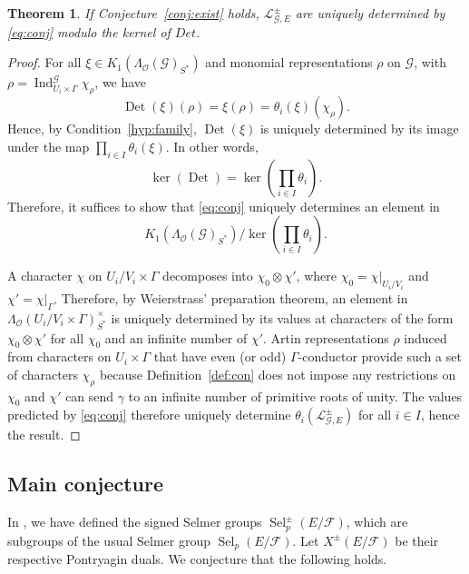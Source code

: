 \documentclass{amsart}
\newtheorem{theorem}{Theorem}[section]
\begin{document}
\begin{theorem}
If Conjecture~\ref{conj:exist} holds, ${\mathcal{L}}_{{\mathcal{G}},E}^\pm$ are uniquely determined by \eqref{eq:conj} modulo the kernel of $Det$.
\end{theorem}
\begin{proof}

 For all $\xi\in K_1(\Lambda_{\mathcal{O}}({\mathcal{G}})_{S^*})$ and monomial representations $\rho$ on ${\mathcal{G}}$, with $\rho=\operatorname{Ind}_{U_i\times\Gamma}^{\mathcal{G}}\chi_\rho$, we have
\[
\operatorname{Det}(\xi)(\rho)=\xi(\rho)=\theta_i(\xi)(\chi_\rho).
\]
Hence, by Condition~\ref{hyp:family}, $\operatorname{Det}(\xi)$ is uniquely determined by its image under the map $\prod_{i\in I}{\theta_i}(\xi)$. In other words,
\[
\ker(\operatorname{Det})=\ker\left(\prod_{i\in I}{\theta_i}\right).
\]
Therefore, it suffices to show that \eqref{eq:conj} uniquely determines an element in 
\[
K_1(\Lambda_{\mathcal{O}}({\mathcal{G}})_{S^*})/\ker\left(\prod_{i\in I}{\theta_i}\right).
\]

 A character $\chi$ on $U_i/V_i\times\Gamma$  decomposes into $\chi_0\otimes\chi'$, where $\chi_0=\chi|_{U_i/V_i}$ and $\chi'=\chi|_{\Gamma}$. Therefore, by Weierstrass' preparation theorem, an element in $\Lambda_{\mathcal{O}}(U_i/V_i\times\Gamma)^\times_{S^*}$ is uniquely determined by its values at characters of the form $\chi_0\otimes\chi'$ for all $\chi_0$ and an infinite number of $\chi'$. Artin representations $\rho$ induced from characters on $U_i\times\Gamma$ that have even (or odd) $\Gamma$-conductor provide such a set of characters $\chi_\rho$ because Definition~\ref{def:con} does not impose any restrictions on $\chi_0$ and $\chi'$ can send $\gamma$ to an infinite number of primitive roots of unity. The values predicted by \eqref{eq:conj} therefore uniquely determine $\theta_i({\mathcal{L}}_{{\mathcal{G}},E}^\pm)$ for all $i\in I$,  hence the result.
 
 
 
\end{proof}

\subsection{Main conjecture}\label{sec:main}

In \cite{leizerbes11}, we have defined the signed Selmer groups $\operatorname{Sel}^\pm_p(E/{\mathcal{F}})$, which are subgroups of the usual Selmer group $\operatorname{Sel}_p(E/{\mathcal{F}})$. Let $X^\pm(E/{\mathcal{F}})$ be their respective Pontryagin duals. We conjecture that the following holds.
\end{document}
